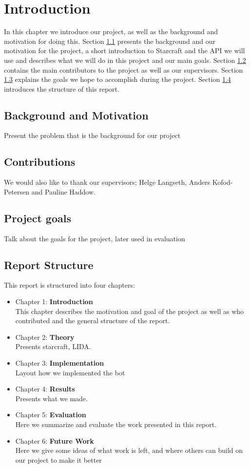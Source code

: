 
\chapter{Introduction}
In this chapter we introduce our project, as well as the background and
motivation for doing this. Section \ref{sec:background} presents the background
and our motivation for the project, a short introduction to Starcraft and the
API we will use and describes what we will do in this project and our main
goals. Section \ref{sec:contributions} contains the main contributors to the
project as well as our supervisors. Section \ref{sec:goals} explains the goals we hope to accomplish during the project. 
Section \ref{sec:structure} introduces the
structure of this report.

\section{Background and Motivation}
\label{sec:background}
Present the problem that is the background for our project


\section{Contributions}
\label{sec:contributions}
We would also like to thank our supervisors; Helge Langseth, Anders
Kofod-Petersen and Pauline Haddow.

\section{Project goals}
\label{sec:goals}
Talk about the goals for the project, later used in evaluation

\section{Report Structure}
\label{sec:structure}
This report is structured into four chapters:
\begin{itemize}
\item Chapter 1: \textbf{Introduction} \\
This chapter describes the motivation and goal of the project as well as who
contributed and the general structure of the report.
\item Chapter 2: \textbf{Theory} \\
Presents starcraft, LIDA.
\item Chapter 3: \textbf{Implementation} \\
Layout how we implemented the bot 
\item Chapter 4: \textbf{Results} \\
Presents what we made.
\item Chapter 5: \textbf{Evaluation} \\
Here we summarize and evaluate the work presented in this report.
\item Chapter 6: \textbf{Future Work} \\
Here we give some ideas of what work is left, and where others can build on our project to make it better

\end{itemize}